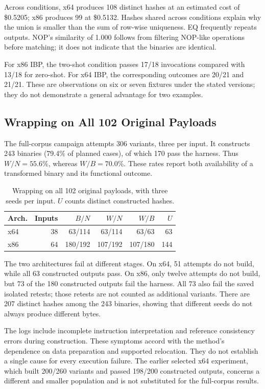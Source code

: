 Across conditions, x64 produces 108 distinct hashes at an estimated cost
of \$0.5205; x86 produces 99 at \$0.5132. Hashes shared across conditions
explain why the union is smaller than the sum of row-wise uniqueness.
EQ frequently repeats outputs. NOP's similarity of 1.000 follows from
filtering NOP-like operations before matching; it does not indicate that
the binaries are identical.

For x86 IBP, the two-shot condition passes 17/18 invocations compared with
13/18 for zero-shot. For x64 IBP, the corresponding outcomes are 20/21 and
21/21. These are observations on six or seven fixtures under the stated
versions; they do not demonstrate a general advantage for two examples.

\subsection{Wrapping on All 102 Original Payloads}
The full-corpus campaign attempts 306 variants, three per input. It constructs
243 binaries (79.4\% of planned cases), of which 170 pass the harness.
Thus $W/N=55.6$\%, whereas $W/B=70.0$\%. These rates report both availability of a transformed binary and
its functional outcome.


\begin{table}[t]
\caption{Wrapping on all 102 original payloads, with three seeds per input.
$U$ counts distinct constructed hashes.}
\label{tab:new_wrap_full}
\centering\small
\begin{tabular}{@{}lrrrrr@{}}
\toprule
Arch. & Inputs & $B/N$ & $W/N$ & $W/B$ & $U$ \\
\midrule
x64 & 38 & 63/114 & 63/114 & 63/63 & 63 \\
x86 & 64 & 180/192 & 107/192 & 107/180 & 144 \\
\bottomrule
\end{tabular}
\end{table}


The two architectures fail at different stages. On x64, 51 attempts do
not build, while all 63 constructed outputs pass. On x86, only twelve
attempts do not build, but 73 of the 180 constructed outputs fail the
harness. All 73 also fail the saved isolated retests; those retests are
not counted as additional variants. There are 207 distinct hashes among
the 243 binaries, showing that different seeds do not always produce
different bytes.

The logs include incomplete instruction interpretation and reference
consistency errors during construction. These symptoms accord with the
method's dependence on data preparation and supported relocation. They
do not establish a single cause for every execution failure. The earlier
selected x64 experiment, which built 200/260 variants and passed 198/200
constructed outputs, concerns a different and smaller population and is
not substituted for the full-corpus results.

